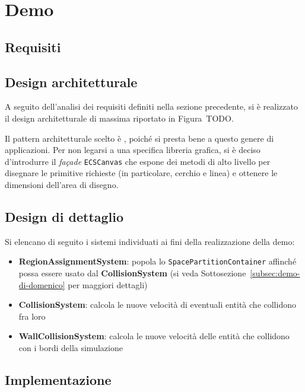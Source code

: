\chapter{Demo}\label{ch:demo}

\section{Requisiti}\label{sec:demo-requisiti}

\section{Design architetturale}\label{sec:demo-design-architetturale}
A seguito dell'analisi dei requisiti definiti nella sezione precedente, si è realizzato il design architetturale di
massima riportato in Figura~TODO.

Il pattern architetturale scelto è \ECS, poiché si presta bene a questo genere di applicazioni.
Per non legarsi a una specifica libreria grafica, si è deciso d'introdurre il \textit{façade} \texttt{ECSCanvas}
che espone dei metodi di alto livello per disegnare le primitive richieste (in particolare, cerchio e linea) e ottenere
le dimensioni dell'area di disegno.

\section{Design di dettaglio}\label{sec:demo-design-di-dettaglio}

Si elencano di seguito i sistemi individuati ai fini della realizzazione della demo:
\begin{itemize}
    \item \textbf{RegionAssignmentSystem}: popola lo \texttt{SpacePartitionContainer} affinché possa essere usato dal
    \textbf{CollisionSystem} (si veda Sottosezione~\ref{subsec:demo-di-domenico} per maggiori dettagli)
    \item \textbf{CollisionSystem}: calcola le nuove velocità di eventuali entità che collidono fra loro
    \item \textbf{WallCollisionSystem}: calcola le nuove velocità delle entità che collidono con i bordi della simulazione
\end{itemize}

\section{Implementazione}\label{sec:demo-implementazione}

